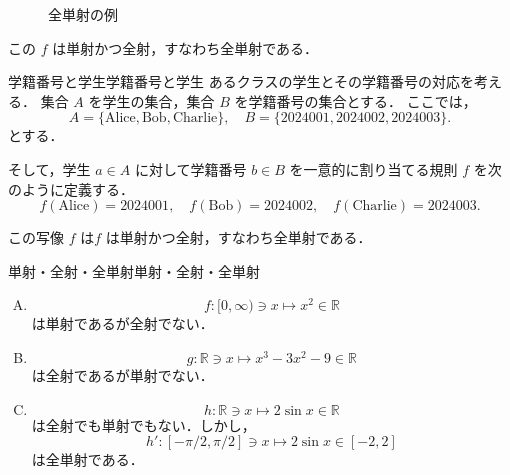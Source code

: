 \documentclass[a4paper,11pt]{ltjsarticle}
\begin{document}
\begin{figure}[ht]
  \centering
  \caption{全単射の例}
\end{figure}

この $f$ は単射かつ全射，すなわち全単射である．

\begin{example}{学籍番号と学生}{学籍番号と学生}
  あるクラスの学生とその学籍番号の対応を考える．
  集合 $A$ を学生の集合，集合 $B$ を学籍番号の集合とする．
  ここでは，
  \[
    A = \{\text{Alice}, \text{Bob}, \text{Charlie}\}, \quad
    B = \{\text{2024001}, \text{2024002}, \text{2024003}\}.
  \]
  とする．

  そして，学生 $a \in A$ に対して学籍番号 $b \in B$ を一意的に割り当てる規則 $f$ を次のように定義する．
  \[
    f(\text{Alice}) = \text{2024001}, \quad
    f(\text{Bob}) = \text{2024002}, \quad
    f(\text{Charlie}) = \text{2024003}.
  \]

  この写像 $f$ は$f$ は単射かつ全射，すなわち全単射である．
\end{example}

\begin{example}{単射・全射・全単射}{単射・全射・全単射}
  \begin{enumerate}[(A)]
    \item
          \[
            f \colon [0,\infty) \ni x \mapsto x^2  \in \mathbb{R}
          \]
          は単射であるが全射でない．
    \item
          \[
            g \colon \mathbb{R} \ni x \mapsto x^3 -3x^2 -9 \in \mathbb{R}
          \]
          は全射であるが単射でない．
    \item
          \[
            h  \colon \mathbb{R} \ni x \mapsto  2 \sin x \in  \mathbb{R}
          \]
          は全射でも単射でもない．しかし，
          \[
            h'  \colon [-\pi/2 , \pi/2 ]  \ni x \mapsto  2 \sin  x  \in [-2,2]
          \]
          は全単射である．
  \end{enumerate}
\end{example}
\clearpage
\end{document}
